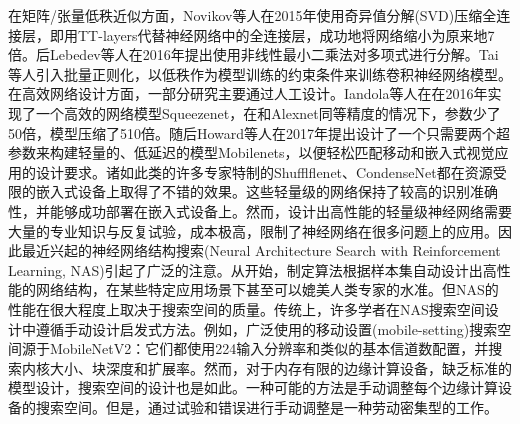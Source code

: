在矩阵/张量低秩近似方面，Novikov等人在2015年使用奇异值分解(SVD)\cite{novikov2015tensorizing}压缩全连接层，即用TT-layers代替神经网络中的全连接层，成功地将网络缩小为原来地7倍。后Lebedev等人在2016年\cite{lebedev2016fast}提出使用非线性最小二乘法对多项式进行分解。Tai等人\cite{tai2015convolutional}引入批量正则化，以低秩作为模型训练的约束条件来训练卷积神经网络模型。
在高效网络设计方面，一部分研究主要通过人工设计\cite{zhang2018shufflenet,huang2018condensenet,howard2017mobilenets,iandola2016squeezenet}。Iandola等人在在2016年实现了一个高效的网络模型Squeezenet\cite{iandola2016squeezenet}，在和Alexnet同等精度的情况下，参数少了50倍，模型压缩了510倍。随后Howard等人在2017年提出设计了一个只需要两个超参数来构建轻量的、低延迟的模型Mobilenets\cite{howard2017mobilenets}，以便轻松匹配移动和嵌入式视觉应用的设计要求。诸如此类的许多专家特制的Shufflflenet、CondenseNet\cite{zhang2018shufflenet,huang2018condensenet}都在资源受限的嵌入式设备上取得了不错的效果。这些轻量级的网络保持了较高的识别准确性，并能够成功部署在嵌入式设备上。然而，设计出高性能的轻量级神经网络需要大量的专业知识与反复试验，成本极高，限制了神经网络在很多问题上的应用。因此最近兴起的神经网络结构搜索(Neural Architecture Search with Reinforcement Learning, NAS)引起了广泛的注意。从\cite{cai2018efficient,wu2019fbnet}开始，制定算法根据样本集自动设计出高性能的网络结构，在某些特定应用场景下甚至可以媲美人类专家的水准。但NAS的性能在很大程度上取决于搜索空间的质量\cite{radosavovic2020designing}。传统上，许多学者在NAS搜索空间设计中遵循手动设计启发式方法。例如，广泛使用的移动设置(mobile-setting)搜索空间\cite{canziani2016analysis}源于MobileNetV2\cite{tan2019mnasnet}：它们都使用224输入分辨率和类似的基本信道数配置，并搜索内核大小、块深度和扩展率。然而，对于内存有限的边缘计算设备，缺乏标准的模型设计，搜索空间的设计也是如此。一种可能的方法是手动调整每个边缘计算设备的搜索空间。但是，通过试验和错误进行手动调整是一种劳动密集型的工作。


